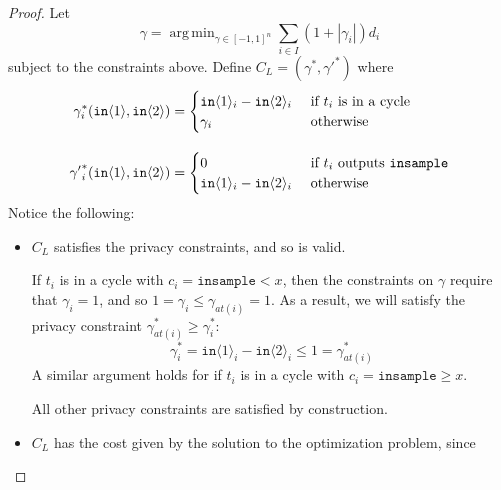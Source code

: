 \documentclass[12pt]{article}
\newcommand{\gguard}[1][x]{\texttt{insample}\geq #1}
\newcommand{\lguard}[1][x]{\texttt{insample} < #1}
\newcommand{\brangle}[1]{\langle #1 \rangle}
\DeclareMathOperator*{\argmin}{arg\,min}
\theoremstyle{definition}
\begin{document}
\begin{proof}
    Let 
    \[\gamma = \argmin_{\gamma \in [-1, 1]^n} \sum_{i \in I} \left(1 + |\gamma_i| \right) d_i\]
    subject to the constraints above. Define $C_L = (\gamma^*, {\gamma'}^*)$ where
    \begin{align*}
        \gamma_i^*(\texttt{in}\brangle{1}, \texttt{in}\brangle{2}) &= \begin{cases}
            \texttt{in}\brangle{1}_i - \texttt{in}\brangle{2}_i &\text{ if } t_i \text{ is in a cycle} \\
            \gamma_i &\text{ otherwise}
        \end{cases} \\[1em]
        {\gamma'}_i^*(\texttt{in}\brangle{1}, \texttt{in}\brangle{2}) &= \begin{cases}
            0 &\text{ if } t_i \text{ outputs \texttt{insample}} \\
            \texttt{in}\brangle{1}_i - \texttt{in}\brangle{2}_i &\text{ otherwise}
        \end{cases}
    \end{align*}
    Notice the following: 

    \begin{itemize}
        \item $C_L$ satisfies the privacy constraints, and so is valid.
        
        If $t_i$ is in a cycle with $c_i = \lguard$, then the constraints on $\gamma$ require that $\gamma_i = 1$, and so $1 = \gamma_i \leq \gamma_{at(i)} = 1$. As a result, we will satisfy the privacy constraint $\gamma_{at(i)}^* \geq \gamma_i^*$: 
        \[\gamma_i^* = \texttt{in}\brangle{1}_i - \texttt{in}\brangle{2}_i \leq 1 = \gamma_{at(i)}^*\]
        A similar argument holds for if $t_i$ is in a cycle with $c_i = \gguard$.

        All other privacy constraints are satisfied by construction.

        \item $C_L$ has the cost given by the solution to the optimization problem, since
        

\end{itemize}
\end{proof}
\end{document}
